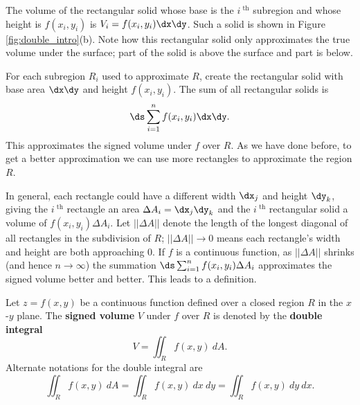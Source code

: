 The volume of the rectangular solid whose base is the $i^\text{ th}$ subregion and whose height is $f(x_i,y_i)$ is $V_i=f(x_i,y_i)\dx\dy$. Such a  solid is shown in Figure \ref{fig:double_intro}(b). Note how this rectangular solid only approximates the true volume under the surface; part of the solid is above the surface and part is below.

For each subregion $R_i$ used to approximate $R$, create the rectangular solid with base area $\dx\dy$ and height $f(x_i,y_i)$. 
The sum of all rectangular solids is $$\ds \sum_{i=1}^n f(x_i,y_i)\dx\dy.$$ This approximates the signed volume under $f$ over $R$. As we have done before, to get a better approximation we can use more rectangles to approximate the region $R$.

In general, each rectangle could have a different width $\dx_j$ and height $\dy_k$, giving the $i^\text{ th}$ rectangle an area $\Delta A_i = \dx_j\dy_k$ and the $i^\text{ th}$ rectangular solid a volume of $f(x_i,y_i)\Delta A_i$. Let $||\Delta A||$ denote the length of the longest diagonal of all rectangles in the subdivision of $R$; $||\Delta A||\to 0$ means each rectangle's width and height are both approaching 0. If $f$ is a continuous function, as $||\Delta A||$ shrinks (and hence $n\to\infty$) the summation $\ds \sum_{i=1}^n f(x_i,y_i)\Delta A_i$ approximates the signed volume better and better. This leads to a definition.


{Let $z=f(x,y)$ be a continuous function defined over a closed region $R$ in the $x$-$y$ plane. The \textbf{signed volume} $V$ under $f$ over $R$ is denoted by the \textbf{double integral}
$$V = \iint_R f(x,y)\ dA.$$
Alternate notations for the double integral are
$$\iint_R f(x,y)\ dA=\iint_R f(x,y)\ dx\ dy=\iint_R f(x,y)\ dy\ dx.$$
}

